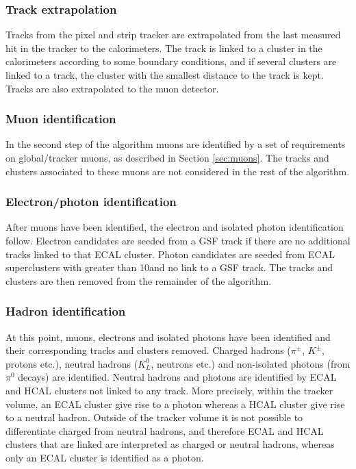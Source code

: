 \subsubsection*{Track extrapolation}
\noindent\justify
Tracks from the pixel and strip tracker are extrapolated from the last measured hit in the tracker to the calorimeters. 
The track is linked to a cluster in the calorimeters according to some boundary conditions, and if several clusters are linked to a track, the cluster with the smallest distance to the track is kept. 
Tracks are also extrapolated to the muon detector. 
\subsubsection*{Muon identification} 
\noindent\justify
In the second step of the algorithm muons are identified by a set of requirements on global/tracker muons, as described in Section \ref{sec:muons}.
The tracks and clusters associated to these muons are not considered in the rest of the algorithm. 
\subsubsection*{Electron/photon identification} 
\noindent\justify
After muons have been identified, the electron and isolated photon identification follow.
Electron candidates are seeded from a GSF track if there are no additional tracks linked to that ECAL cluster. 
Photon candidates are seeded from ECAL superclusters with \ET greater than 10\GeV and no link to a GSF track.
The tracks and clusters are then removed from the remainder of the algorithm. 
\subsubsection*{Hadron identification}  
\noindent\justify
At this point, muons, electrons and isolated photons have been identified and their corresponding tracks and clusters removed.
Charged hadrons ($\pi^{\pm}$, $K^{\pm}$, protons etc.), neutral hadrons ($K_{L}^{0}$, neutrons etc.) and non-isolated photons (from $\pi^{0}$ decays) are identified. 
Neutral hadrons and photons are identified by ECAL and HCAL clusters not linked to any track. 
More precisely, within the tracker volume, an ECAL cluster give rise to a photon whereas a HCAL cluster give rise to a neutral hadron. 
Outside of the tracker volume it is not possible to differentiate charged from neutral hadrons, and therefore ECAL and HCAL clusters that are linked are interpreted as charged or neutral hadrons, whereas only an ECAL cluster is identified as a photon. 
